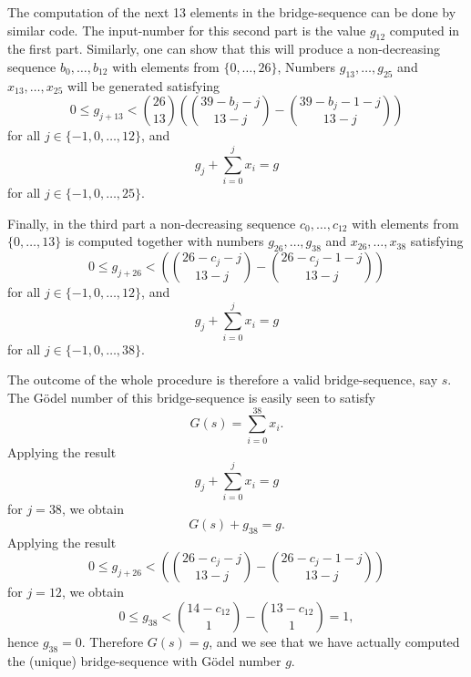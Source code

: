 The computation of the next 13 elements in the bridge-sequence can be done by
similar code. The input-number for this second part is the value $g_{12}$
computed in the first part. Similarly, one can show that this will produce a
non-decreasing sequence $b_0,\ldots,b_{12}$ with elements from
$\{0,\ldots,26\}$, Numbers $g_{13},\ldots,g_{25}$ and $x_{13},\ldots,x_{25}$
will be generated satisfying $$\displaystyle 0\leq g_{j+13} < {26\choose 13}
({39-b_j-j\choose 13-j} - {39-b_j-1-j\choose 13-j})$$ for all $j\in
\{-1,0,\ldots,12\}$, and $$\displaystyle g_j + \sum_{i=0}^j x_i = g$$ for all
$j\in \{-1,0,\ldots,25\}$.

Finally, in the third part a non-decreasing sequence $c_0,\ldots,c_{12}$
with elements from $\{0,\ldots,13\}$ is computed together with
numbers $g_{26},\ldots,g_{38}$ and $x_{26},\ldots,x_{38}$ satisfying
$$\displaystyle 0\leq g_{j+26} < ({26-c_j-j\choose 13-j} - {26-c_j-1-j\choose
13-j})$$ for all $j\in \{-1,0,\ldots,12\}$, and
$$\displaystyle g_j + \sum_{i=0}^j x_i = g$$ for
all $j\in \{-1,0,\ldots,38\}$.

The outcome of the whole procedure is therefore a valid bridge-sequence,
say $s$. The G\"odel number of this bridge-sequence is easily seen to satisfy
$$\displaystyle G(s) = \sum_{i=0}^{38} x_i.$$
Applying the result $$\displaystyle g_j + \sum_{i=0}^j x_i = g$$ for
$j = 38$, we obtain $$G(s) + g_{38} = g.$$ Applying the result
$$\displaystyle 0\leq g_{j+26} < ({26-c_j-j\choose 13-j} - {26-c_j-1-j\choose
13-j})$$ for $j = 12$, we obtain $$\displaystyle 0\leq g_{38} < {14-c_{12}\choose 1}
- {13-c_{12}\choose 1} = 1,$$ hence $g_{38} = 0$. Therefore $G(s) = g$, and we see
that we have actually computed the (unique) bridge-sequence with G\"odel number $g$.



